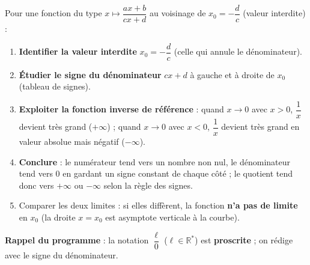 \documentclass[11pt]{article}
\begin{document}
\begin{methode}
Pour une fonction du type $x\mapsto \dfrac{ax+b}{cx+d}$ au voisinage de $x_0=-\dfrac{d}{c}$ (valeur interdite) :
\begin{enumerate}
\item \textbf{Identifier la valeur interdite} $x_0=-\dfrac{d}{c}$ (celle qui annule le dénominateur).
\item \textbf{Étudier le signe du dénominateur} $cx+d$ à gauche et à droite de $x_0$ (tableau de signes).
\item \textbf{Exploiter la fonction inverse de référence} : quand $x\to 0$ avec $x>0$, $\dfrac{1}{x}$ devient très grand ($+\infty$) ; quand $x\to 0$ avec $x<0$, $\dfrac{1}{x}$ devient très grand en valeur absolue mais négatif ($-\infty$).
\item \textbf{Conclure} : le numérateur tend vers un nombre non nul, le dénominateur tend vers $0$ en gardant un signe constant de chaque côté ; le quotient tend donc vers $+\infty$ ou $-\infty$ selon la règle des signes.
\item Comparer les deux limites : si elles diffèrent, la fonction \textbf{n'a pas de limite} en $x_0$ (la droite $x=x_0$ est asymptote verticale à la courbe).
\end{enumerate}
\textbf{Rappel du programme} : la notation $\dfrac{\ell}{0}$ ($\ell\in\mathbb{R}^*$) est \textbf{proscrite} ; on rédige avec le signe du dénominateur.
\end{methode}
\end{document}
